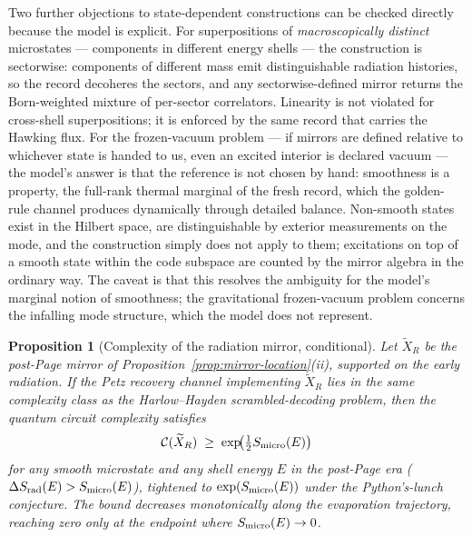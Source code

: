 \documentclass[12pt]{article}
\newcommand{\Smicro}{S_{\rm micro}}
\newtheorem{proposition}{Proposition}
\begin{document}
Two further objections to state-dependent constructions can be checked
directly because the model is explicit.  For superpositions of
\emph{macroscopically distinct} microstates --- components in different
energy shells --- the construction is sectorwise: components of different
mass emit distinguishable radiation histories, so the record decoheres the
sectors, and any sectorwise-defined mirror returns the Born-weighted mixture
of per-sector correlators.  Linearity is not violated for cross-shell
superpositions; it is enforced by the same record that carries the Hawking
flux.  For the frozen-vacuum problem \cite{Bousso2014} --- if mirrors are
defined relative to whichever state is handed to us, even an excited interior
is declared vacuum --- the model's answer is that the reference is not chosen
by hand: smoothness is a property, the full-rank thermal marginal of the
fresh record, which the golden-rule channel produces dynamically through
detailed balance.  Non-smooth states exist in the Hilbert space, are
distinguishable by exterior measurements on the mode, and the construction
simply does not apply to them; excitations on top of a smooth state within
the code subspace are counted by the mirror algebra in the ordinary way.
The caveat is that this resolves the ambiguity for the model's marginal
notion of smoothness; the gravitational frozen-vacuum problem concerns the
infalling mode structure, which the model does not represent.

\begin{proposition}[Complexity of the radiation mirror, conditional]
\label{prop:mirror-complexity}
Let $\widetilde X_R$ be the post-Page mirror of
Proposition~\ref{prop:mirror-location}(ii), supported on the early radiation.
If the Petz recovery channel implementing $\widetilde X_R$ lies in the same
complexity class as the Harlow--Hayden scrambled-decoding problem, then
the quantum circuit complexity satisfies
\begin{equation}
    \mathcal C(\widetilde X_R)
    \;\geq\;
    \exp\!\bigl(\tfrac{1}{2}\Smicro(E)\bigr)
    \label{eq:mirror-complexity}
\end{equation}
for any smooth microstate and any shell energy $E$ in the post-Page era
($\Delta S_{\rm rad}(E)>\Smicro(E)$), tightened to
$\exp(\Smicro(E))$ under the Python's-lunch conjecture.
The bound decreases monotonically along the evaporation trajectory,
reaching zero only at the endpoint where $\Smicro(E)\to0$.
\end{proposition}
\end{document}
